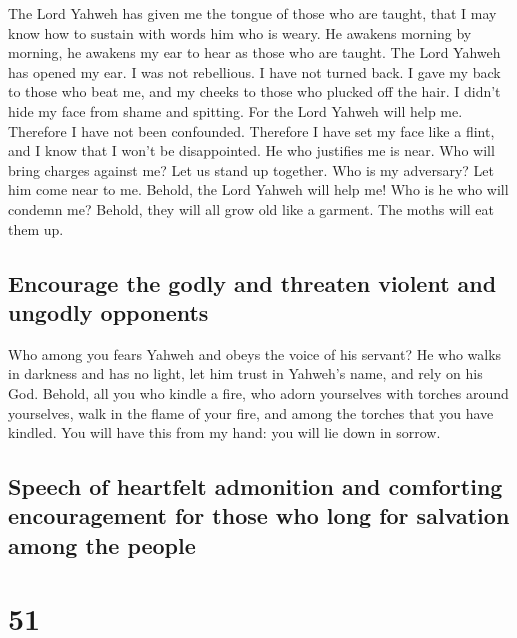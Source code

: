  The Lord Yahweh has given me the tongue of those who are
taught, that I may know how to sustain with words him who is weary. He
awakens morning by morning, he awakens my ear to hear as those who are
taught.  The Lord Yahweh has opened my ear. I was not
rebellious. I have not turned back.  I gave my back to
those who beat me, and my cheeks to those who plucked off the hair. I
didn't hide my face from shame and spitting.  For the Lord
Yahweh will help me. Therefore I have not been confounded. Therefore I
have set my face like a flint, and I know that I won't be disappointed.
 He who justifies me is near. Who will bring charges
against me? Let us stand up together. Who is my adversary? Let him come
near to me.  Behold, the Lord Yahweh will help me! Who is
he who will condemn me? Behold, they will all grow old like a garment.
The moths will eat them up.

\hypertarget{encourage-the-godly-and-threaten-violent-and-ungodly-opponents}{%
\subsection{Encourage the godly and threaten violent and ungodly
opponents}\label{encourage-the-godly-and-threaten-violent-and-ungodly-opponents}}

 Who among you fears Yahweh and obeys the voice of his
servant? He who walks in darkness and has no light, let him trust in
Yahweh's name, and rely on his God.  Behold, all you who
kindle a fire, who adorn yourselves with torches around yourselves, walk
in the flame of your fire, and among the torches that you have kindled.
You will have this from my hand: you will lie down in sorrow.

\hypertarget{speech-of-heartfelt-admonition-and-comforting-encouragement-for-those-who-long-for-salvation-among-the-people}{%
\subsection{Speech of heartfelt admonition and comforting encouragement
for those who long for salvation among the
people}\label{speech-of-heartfelt-admonition-and-comforting-encouragement-for-those-who-long-for-salvation-among-the-people}}

\hypertarget{section-50}{%
\section{51}\label{section-50}}

